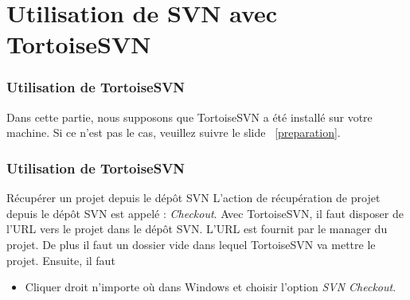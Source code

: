 \documentclass{beamer}
\begin{document}
\section{Utilisation de SVN avec TortoiseSVN}

\begin{frame}
\frametitle{Utilisation de TortoiseSVN}
Dans cette partie, nous supposons que TortoiseSVN a été  installé sur votre machine. Si ce n'est pas le cas, veuillez suivre le slide ~\ref{preparation}.
\end{frame}

\begin{frame}
\frametitle{Utilisation de TortoiseSVN}
\begin{block}{Récupérer un projet depuis le dépôt SVN }
L'action de récupération de projet depuis le dépôt SVN est appelé :  \alert{\textit{Checkout}}. Avec TortoiseSVN, il faut disposer de l'URL vers le projet dans le dépôt SVN. L'URL est fournit par le manager du projet. De plus il faut un dossier vide dans lequel TortoiseSVN va mettre le projet.  Ensuite, il faut
\begin{itemize}
\item Cliquer droit n'importe où dans Windows et choisir l'option \alert{\textit{SVN Checkout}}.
\end{itemize}
\end{block}
\end{frame}
\end{document}
